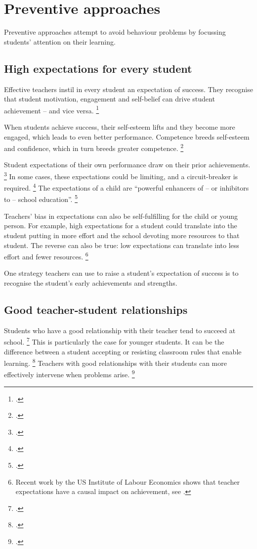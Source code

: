 \documentclass[FrontPage]{grattan}
\begin{document}
\section{Preventive approaches}\label{sec:preventive-approaches}
Preventive approaches attempt to avoid behaviour problems by focussing students' attention on their learning.

\subsection{High expectations for every student}\label{subsec:high-expectations-every-student}
Effective teachers instil in every student an expectation of success. They recognise that student motivation, engagement and self-belief can drive student achievement -- and vice versa.%
    \footcite{OECD2013PISA2012ResultsReadyToLearn}  
 
When students achieve success, their self-esteem lifts and they become more engaged, which leads to even better performance. Competence breeds self-esteem and confidence, which in turn breeds greater competence.%
    \footcites{Brophy2013MotivatingStudentsLearn}{Porter2007StudentBehaviourTheory}
 
Student expectations of their own performance draw on their prior achievements.%
    \footcite{Hattie2008visiblelearningsynthesis} 
In some cases, these expectations could be limiting, and a circuit-breaker is required.%
    \footcite{Hattie2008visiblelearningsynthesis}
The expectations of a child are ``powerful enhancers of -- or inhibitors to -- school education''.%
    \footcite[][31]{Hattie2008visiblelearningsynthesis}

Teachers' bias in expectations can also be self-fulfilling for the child or young person. For example, high expectations for a student could translate into the student putting in more effort and the school devoting more resources to that student. The reverse can also be true: low expectations can translate into less effort and fewer resources.%
    \footnote{Recent work by the US Institute of Labour Economics shows that teacher expectations have a causal impact on achievement, see \textcite{PapageorgeGershenson2016TeacherExpectationsMatter}.}

One strategy teachers can use to raise a student's expectation of success is to recognise the student's early achievements and strengths.

\subsection{Good teacher-student relationships}\label{subsec:teacher-student-relationships}
Students who have a good relationship with their teacher tend to succeed at school.%
    \footcites{Hattie2008visiblelearningsynthesis}{Marzano2003ClassroomManagementWorks}
This is particularly the case for younger students. It can be the difference between a student accepting or resisting classroom rules that enable learning.%
    \footcite{Marzano2003ClassroomManagementWorks}
Teachers with good relationships with their students can more effectively intervene when problems arise.%
\footcites{Epstein2008ReducingBehaviorProblems}{Marzano2003ClassroomManagementWorks}{Montuoro2015StudentPerceptionsMisbehaviour}
\end{document}

